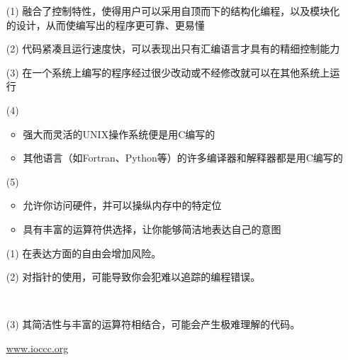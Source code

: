 \begin{frame}
\begin{itemize}
\item[(1)] \quad 融合了控制特性，使得用户可以采用自顶而下的结构化编程，以及模块化的设计，从而使编写出的程序更可靠、更易懂 \\[0.1in] 
 
\item[(2)] \quad  代码紧凑且运行速度快，可以表现出只有汇编语言才具有的精细控制能力  \\[0.1in] 
 
\item[(3)] \quad 在一个系统上编写的程序经过很少改动或不经修改就可以在其他系统上运行 \\[0.1in] 
 
\item[(4)] \\[0.1in] 
\begin{itemize}
\item  强大而灵活的UNIX操作系统便是用C编写的   \\[0.1in] 
\item  其他语言（如Fortran、Python等）的许多编译器和解释器都是用C编写的\\[0.1in] 
\end{itemize}

\item[(5)] \\[0.1in] 
\begin{itemize}
\item 允许你访问硬件，并可以操纵内存中的特定位  \\[0.1in] 
\item 具有丰富的运算符供选择，让你能够简洁地表达自己的意图 
\end{itemize}
\end{itemize}

\end{frame}

\begin{frame}
\begin{itemize}
\item[(1)]  在表达方面的自由会增加风险。\\[0.1in]
\item[(2)]  对指针的使用，可能导致你会犯难以追踪的编程错误。\\[0.1in]
\item[] \\[0.2in]
\item[(3)]  其简洁性与丰富的运算符相结合，可能会产生极难理解的代码。\\[0.1in]
\item[]  
\url{www.ioccc.org}
\end{itemize}
\end{frame}
